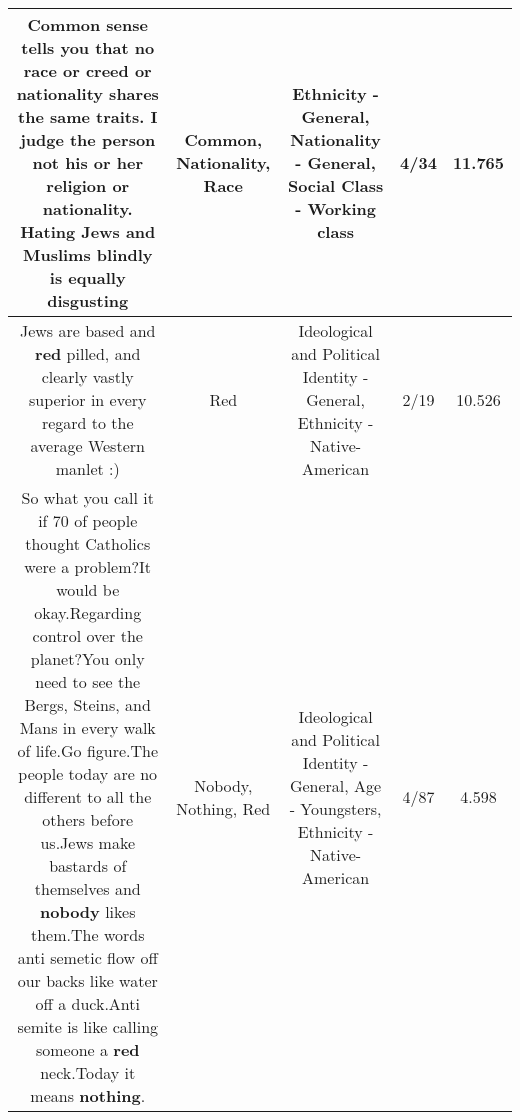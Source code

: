 \documentclass[11pt]{article}
\newlength\mylength
\begin{document}
\begin{center}
\begin{longtable}{|C{.65\mylength}|C{.30\mylength}|C{.12\mylength}|C{.12\mylength}|C{.12\mylength}|}
  \small Common sense tells you that no \textbf{race} or creed or \textbf{nationality} shares the same traits. I judge the person not his or her religion or \textbf{nationality}. Hating Jews and Muslims blindly is equally disgusting\normalsize   & Common, Nationality, Race & Ethnicity - General, Nationality - General, Social Class - Working class & 4/34 & 11.765 \\  \hline
  \small Jews are based and \textbf{r\textbf{ed}} pilled, and clearly vastly superior in every regard to the average Western manlet :)\normalsize   & Red &  Ideological and Political Identity - General, Ethnicity - Native-American & 2/19 & 10.526 \\  \hline
  \small So what you call it if 70 of people thought Catholics were a problem?It would be okay.Regarding control over the planet?You only need to see the Bergs, Steins, and Mans in every walk of life.Go figure.The people today are no different to all the others before us.Jews make bastards of themselves and \textbf{nobody} likes them.The words anti semetic flow off our backs like water off a duck.Anti semite is like calling someone a \textbf{r\textbf{ed}} neck.Today it means \textbf{nothing}.\normalsize   & Nobody, Nothing, Red &  Ideological and Political Identity - General, Age - Youngsters, Ethnicity - Native-American & 4/87 & 4.598 \\  \hline

\end{longtable}
\end{center}
\end{document}
